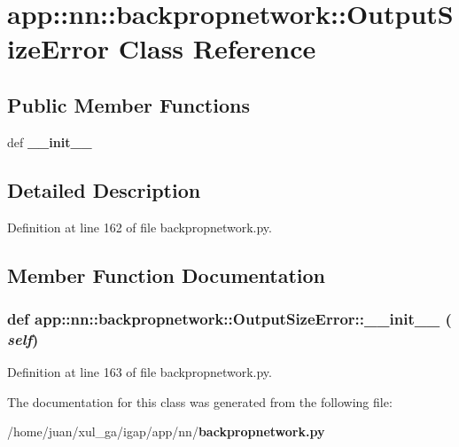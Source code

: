 \section{app::nn::backpropnetwork::OutputSizeError Class Reference}
\label{classapp_1_1nn_1_1backpropnetwork_1_1OutputSizeError}
\subsection*{Public Member Functions}
\begin{CompactItemize}
\item 
def {\bf \_\-\_\-init\_\-\_\-}
\end{CompactItemize}


\subsection{Detailed Description}


Definition at line 162 of file backpropnetwork.py.

\subsection{Member Function Documentation}
\subsubsection{\setlength{\rightskip}{0pt plus 5cm}def app::nn::backpropnetwork::OutputSizeError::\_\-\_\-init\_\-\_\- ( {\em self})}\label{classapp_1_1nn_1_1backpropnetwork_1_1OutputSizeError_ae33dcbd8abb0fe67c209e99bfe16d26}




Definition at line 163 of file backpropnetwork.py.

The documentation for this class was generated from the following file:\begin{CompactItemize}
\item 
/home/juan/xul\_\-ga/igap/app/nn/{\bf backpropnetwork.py}\end{CompactItemize}
